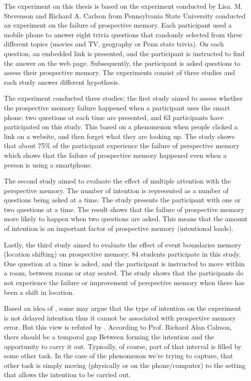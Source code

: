 The experiment on this thesis is based on the experiment conducted by Lisa. M. Stevenson and Richard A. Carlson from Pennsylvania State University conducted an
experiment on the failure of prospective memory.
Each participant used a mobile phone to answer eight trivia questions that randomly selected from three different topics (movies and TV, geography or Penn state trivia). On each question,
an embedded link is presented, and the participant is instructed to find the answer on the web page. Subsequently, the participant is asked questions to assess their prospective memory. The experiments consist of three studies and each study
answer different hypothesis.

The experiment conducted three studies;
the first study aimed to assess whether the prospective memory failure happened when
a participant uses the smart phone. two questions at each time are presented, and 63 participants have participated on this study.
This based on a phenomenon when people clicked a link on a website, and then forget what they are looking up. The study shows that about 75\% of the
participant experience the failure of perspective memory which shows that the failure of prospective memory happened even when a person is using a smartphone.

The second study aimed to evaluate the
effect of multiple attention  with the perspective memory. The number of intention is represented
as a number of questions being asked at a time. The study presents the participant with one or
two questions at a time. The result shows that the failure of prospective memory more likely to
happen when two questions are asked. This means that the amount of intention is an important factor of prospective memory (intentional loads).

Lastly, the third study aimed to evaluate the effect of event boundaries memory (location
shifting) on prospective memory. 84 students participate in this study. One question at a time
is asked, and the participant is instructed to move within a room, between rooms or stay seated.
The study shows that the participants do not experience the failure or improvement of perspective
memory when there has been a shift in location.

Based an idea of \cite{inside1996prospective}, some may argue that the type of intention on the experiment is not delayed intention
thus it cannot be associated with prospective memory error. But this view is
refuted by \cite{10.1371/journal.pone.0074447}. According to Prof. Richard Alan Calrson, there should be a temporal gap
Between forming the intention and the opportunity to carry it out. Typically, of course, part of that interval is filled by some other task.
In the case of the phenomenon we’re trying to capture, that other task is simply moving (physically or on the phone/computer) to the setting that allows the intention to be carried out.
